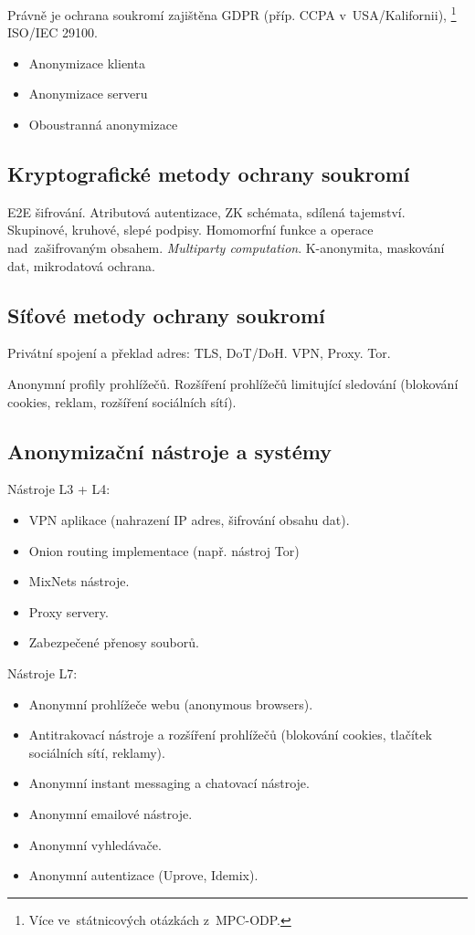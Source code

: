 Právně je ochrana soukromí zajištěna GDPR (příp. CCPA v~USA/Kalifornii),%
\footnote{Více ve~státnicových otázkách z~MPC-ODP.}
ISO/IEC 29100.

\begin{itemize}
    \item Anonymizace klienta
    \item Anonymizace serveru
    \item Oboustranná anonymizace
\end{itemize}


\subsection{Kryptografické metody ochrany soukromí}

E2E šifrování.
Atributová autentizace, ZK schémata, sdílená tajemství.
Skupinové, kruhové, slepé podpisy.
Homomorfní funkce a operace nad~zašifrovaným obsahem.
\emph{Multiparty computation}.
K-anonymita, maskování dat, mikrodatová ochrana.


\subsection{Síťové metody ochrany soukromí}

Privátní spojení a překlad adres: TLS, DoT/DoH.
VPN, Proxy.
Tor.

Anonymní profily prohlížečů.
Rozšíření prohlížečů limitující sledování (blokování cookies, reklam, rozšíření sociálních sítí).

\subsection{Anonymizační nástroje a systémy}

Nástroje L3 + L4:
\vspace*{-0.5em}\begin{itemize}
    \item VPN aplikace (nahrazení IP adres, šifrování obsahu dat).
    \item Onion routing implementace (např. nástroj Tor)
    \item MixNets nástroje.
    \item Proxy servery.
    \item Zabezpečené přenosy souborů.
\end{itemize}

Nástroje L7:
\vspace*{-0.5em}\begin{itemize}
    \item Anonymní prohlížeče webu (anonymous browsers).
    \item Antitrakovací nástroje a rozšíření prohlížečů (blokování cookies, tlačítek sociálních sítí, reklamy).
    \item Anonymní instant messaging a chatovací nástroje.
    \item Anonymní emailové nástroje.
    \item Anonymní vyhledávače.
    \item Anonymní autentizace (Uprove, Idemix).
\end{itemize}

